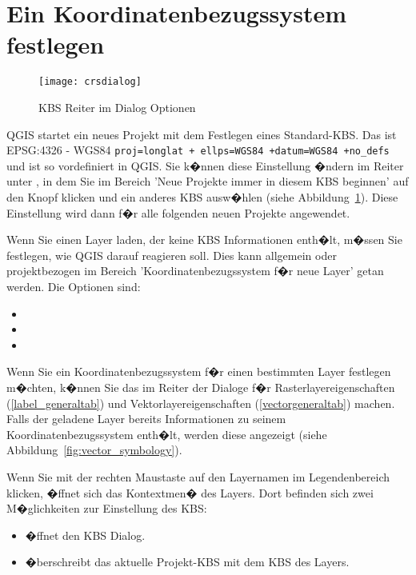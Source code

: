 \section{Ein Koordinatenbezugssystem festlegen}
\label{sec:projection-specifying}

\begin{figure}[ht]
   \begin{center}
   \caption{KBS Reiter im Dialog Optionen \nixcaption}\label{fig:crsdialog}\smallskip
   \texttt{[image: crsdialog]}
\end{center}
\end{figure}

QGIS startet ein neues Projekt mit dem Festlegen eines Standard-KBS. Das ist EPSG:4326 
- WGS84 \texttt{proj=longlat + ellps=WGS84 +datum=WGS84 +no\_defs} und ist so vordefiniert 
in QGIS. Sie k�nnen diese Einstellung �ndern im Reiter  unter  \arrow {}, in dem Sie im Bereich 
'Neue Projekte immer in diesem KBS beginnen' auf den Knopf  klicken 
und ein anderes KBS ausw�hlen (siehe Abbildung~\ref{fig:crsdialog}). Diese 
Einstellung wird dann f�r alle folgenden neuen Projekte angewendet.

Wenn Sie einen Layer laden, der keine KBS Informationen enth�lt, m�ssen Sie festlegen, 
wie QGIS darauf reagieren soll. Dies kann allgemein oder projektbezogen im Bereich 
'Koordinatenbezugssystem f�r neue Layer' getan werden. Die Optionen sind: 

\begin{itemize}[label=--]
\item {} 
\item {}
\item {}
\end{itemize}

Wenn Sie ein Koordinatenbezugssystem f�r einen bestimmten Layer festlegen
m�chten, k�nnen Sie das im Reiter  der Dialoge f�r 
Rasterlayereigenschaften (\ref{label_generaltab}) und
Vektorlayereigenschaften (\ref{vectorgeneraltab}) machen. Falls der geladene
Layer bereits Informationen zu seinem Koordinatenbezugssystem enth�lt,
werden diese angezeigt (siehe Abbildung~\ref{fig:vector_symbology}).

\begin{Tip}
\caption{\textsc{KBS im Kontextmen� des Layers}}
Wenn Sie mit der rechten Maustaste auf den Layernamen im Legendenbereich 
klicken, �ffnet sich das Kontextmen� des Layers. Dort befinden sich zwei 
M�glichkeiten zur Einstellung des KBS:
\begin{itemize}
\item {} �ffnet den KBS Dialog.
\item {} �berschreibt das 
aktuelle Projekt-KBS mit dem KBS des Layers.
\end{itemize}
\end{Tip}


